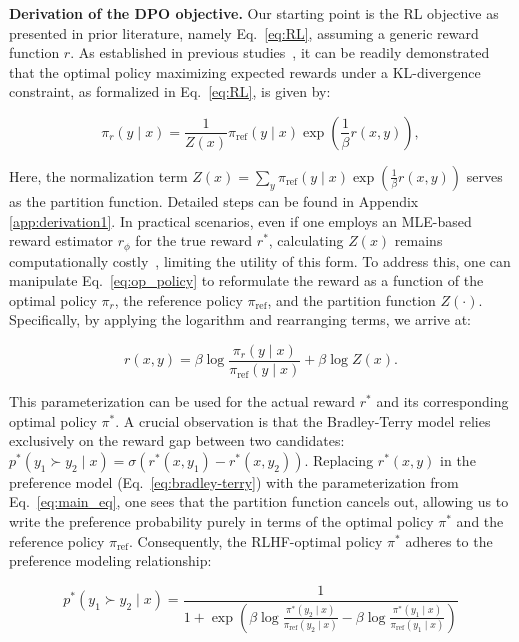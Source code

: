 \textbf{Derivation of the DPO objective.} Our starting point is the RL objective as presented in prior literature, namely Eq.~\ref{eq:RL}, assuming a generic reward function $r$. As established in previous studies~\citep{peters2007reinforcement, peng2019advantage, korbak2022reinforcement, go2023aligning}, it can be readily demonstrated that the optimal policy maximizing expected rewards under a KL-divergence constraint, as formalized in Eq.~\ref{eq:RL}, is given by:

\begin{equation}\label{eq:op_policy}
    \pi_r(y\mid x) = \frac{1}{Z(x)}\pi_\text{ref}(y\mid x)\exp\left(\frac{1}{\beta}r(x, y)\right),
\end{equation}

Here, the normalization term $Z(x) =\sum_{y}\pi_\text{ref}(y\mid x)\exp\left(\frac{1}{\beta}r(x, y)\right)$ serves as the partition function. Detailed steps can be found in Appendix \ref{app:derivation1}. In practical scenarios, even if one employs an MLE-based reward estimator $r_{\phi}$ for the true reward $r^*$, calculating $Z(x)$ remains computationally costly~\citep{korbak2022reinforcement, go2023aligning}, limiting the utility of this form. To address this, one can manipulate Eq.~\ref{eq:op_policy} to reformulate the reward as a function of the optimal policy $\pi_r$, the reference policy $\pi_\text{ref}$, and the partition function $Z(\cdot)$. Specifically, by applying the logarithm and rearranging terms, we arrive at:

\begin{equation}\label{eq:main_eq}
    r(x,y) =\beta \log \frac{\pi_r(y\mid x)}{\pi_\text{ref}(y\mid x)} + \beta \log Z(x).
\end{equation}

This parameterization can be used for the actual reward $r^*$ and its corresponding optimal policy $\pi^*$. A crucial observation is that the Bradley-Terry model relies exclusively on the reward gap between two candidates: ${p^*(y_1 \succ y_2 \mid x) = \sigma(r^*(x, y_1) - r^*(x, y_2))}$. Replacing $r^*(x,y)$ in the preference model (Eq.~\ref{eq:bradley-terry}) with the parameterization from Eq.~\ref{eq:main_eq}, one sees that the partition function cancels out, allowing us to write the preference probability purely in terms of the optimal policy $\pi^*$ and the reference policy $\pi_\text{ref}$. Consequently, the RLHF-optimal policy $\pi^*$ adheres to the preference modeling relationship:

\begin{equation}\label{eq:objective}
    p^*(y_1\succ y_2 \mid x)=\frac{1}{1 + \exp\left(\beta \log \frac{\pi^*(y_2\mid x)}{\pi_\text{ref}(y_2\mid x)} - \beta \log \frac{\pi^*(y_1\mid x)}{\pi_\text{ref}(y_1\mid x)}\right)}
\end{equation}

